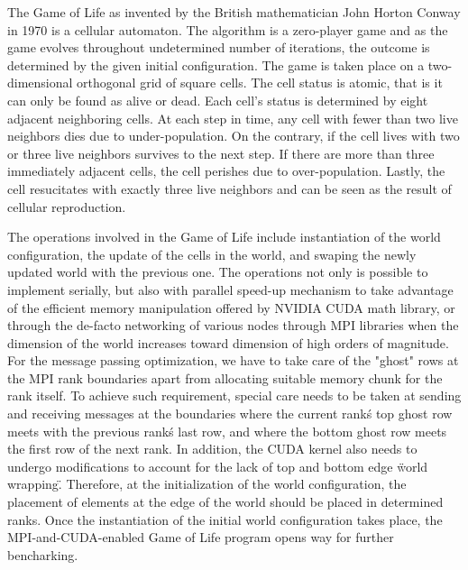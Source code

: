 
The Game of Life as invented by the British mathematician John Horton Conway in 1970 \cite{gardener1970mathematical} is a cellular automaton. The algorithm is a zero-player game and as the game evolves throughout undetermined number of iterations, the outcome is determined by the given initial configuration. The game is taken place on a two-dimensional orthogonal grid of square cells. The cell status is atomic, that is it can only be found as alive or dead. Each cell's status is determined by eight adjacent neighboring cells. At each step in time, any cell with fewer than two live neighbors dies due to under-population. On the contrary, if the cell lives with two or three live neighbors survives to the next step. If there are more than three immediately adjacent cells, the cell perishes due to over-population. Lastly, the cell resucitates with exactly three live neighbors and can be seen as the result of cellular reproduction. 

The operations involved in the Game of Life include instantiation of the world configuration, the update of the cells in the world, and swaping the newly updated world with the previous one. The operations not only is possible to implement serially, but also with parallel speed-up mechanism to take advantage of the efficient memory manipulation offered by NVIDIA CUDA math library, or through the de-facto networking of various nodes through MPI libraries when the dimension of the world increases toward dimension of high orders of magnitude. For the message passing optimization, we have to take care of the "ghost" rows at the MPI rank boundaries apart from allocating suitable memory chunk for the rank itself. To achieve such requirement, special care needs to be taken at sending and receiving messages at the boundaries where the current rank\'s top ghost row meets with the previous rank\'s last row, and where the bottom ghost row meets the first row of the next rank. In addition, the CUDA kernel also needs to undergo modifications to account for the lack of top and bottom edge \"world wrapping\". Therefore, at the initialization of the world configuration, the placement of elements at the edge of the world should be placed in determined ranks. Once the instantiation of the initial world configuration takes place, the MPI-and-CUDA-enabled Game of Life program opens way for further bencharking. 

